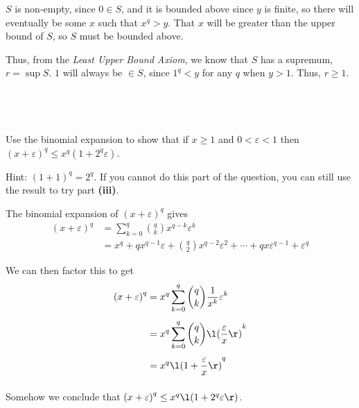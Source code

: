 \documentclass[a4paper]{article}
\begin{document}
$S$ is non-empty, since $0 \in S$, and it is bounded above since $y$ is finite, so there will eventually be some $x$ such that $x^q > y$. That $x$ will be greater than the upper bound of $S$, so $S$ must be bounded above.

Thus, from the \textit{Least Upper Bound Axiom}, we know that $S$ has a supremum, $r = \sup S$. $1$ will always be $\in S$, since $1^q < y$ for any $q$ when $y > 1$. Thus, $r \ge 1$.

\subsection{~} %

\begin{questionbody}
Use the binomial expansion to show that if $x \ge 1$ and $0 < \varepsilon < 1$ then ${(x + \varepsilon)}^q \le x^q (1 + 2^q \varepsilon)$.

Hint: ${(1 + 1)}^q = 2^q$. If you cannot do this part of the question, you can still use the result to try part \textbf{(iii)}.
\end{questionbody}

The binomial expansion of ${(x + \varepsilon)}^q$ gives \begin{align*}
    {(x + \varepsilon)}^q &= \sum_{k=0}^q \binom{q}{k} x^{q-k} \varepsilon^k \\[1ex]
                          &= x^q + q x^{q-1} \varepsilon + \binom{q}{2} x^{q-2} \varepsilon^2 + \cdots + q x \varepsilon^{q-1} + \varepsilon^q
\end{align*}

We can then factor this to get \begin{align*}
    {(x + \varepsilon)}^q &= x^q \sum_{k=0}^q \binom{q}{k} \frac1{x^k} \varepsilon^k \\[1ex]
                          &= x^q \sum_{k=0}^q \binom{q}{k} {\l( \frac{\varepsilon}{x} \r)}^k \\[1ex]
                          &= x^q {\l( 1 + \frac{\varepsilon}{x} \r)}^q \\[1ex]
\end{align*}

Somehow we conclude that ${(x + \varepsilon)}^q \le x^q \l( 1 + 2^q \varepsilon \r)$.

\subsection{~} %
\end{document}
